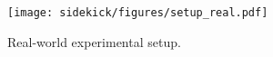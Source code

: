 \begin{figure}[t]
\centering
\texttt{[image: sidekick/figures/setup\_real.pdf]}
\caption{Real-world experimental setup.
}
\label{fig:sidekick:real-setup}
\end{figure}
